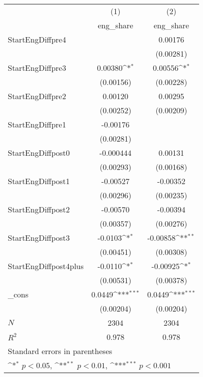 {
\def\sym#1{\ifmmode^{#1}\else\(^{#1}\)\fi}
\begin{tabular}{l*{2}{c}}
\hline\hline
            &\multicolumn{1}{c}{(1)}&\multicolumn{1}{c}{(2)}\\
            &\multicolumn{1}{c}{eng\_share}&\multicolumn{1}{c}{eng\_share}\\
\hline
StartEngDiffpre4&                     &     0.00176         \\
            &                     &   (0.00281)         \\
[1em]
StartEngDiffpre3&     0.00380\sym{*}  &     0.00556\sym{*}  \\
            &   (0.00156)         &   (0.00228)         \\
[1em]
StartEngDiffpre2&     0.00120         &     0.00295         \\
            &   (0.00252)         &   (0.00209)         \\
[1em]
StartEngDiffpre1&    -0.00176         &                     \\
            &   (0.00281)         &                     \\
[1em]
StartEngDiffpost0&   -0.000444         &     0.00131         \\
            &   (0.00293)         &   (0.00168)         \\
[1em]
StartEngDiffpost1&    -0.00527         &    -0.00352         \\
            &   (0.00296)         &   (0.00235)         \\
[1em]
StartEngDiffpost2&    -0.00570         &    -0.00394         \\
            &   (0.00357)         &   (0.00276)         \\
[1em]
StartEngDiffpost3&     -0.0103\sym{*}  &    -0.00858\sym{**} \\
            &   (0.00451)         &   (0.00308)         \\
[1em]
StartEngDiffpost4plus&     -0.0110\sym{*}  &    -0.00925\sym{*}  \\
            &   (0.00531)         &   (0.00378)         \\
[1em]
\_cons      &      0.0449\sym{***}&      0.0449\sym{***}\\
            &   (0.00204)         &   (0.00204)         \\
\hline
\(N\)       &        2304         &        2304         \\
\(R^{2}\)   &       0.978         &       0.978         \\
\hline\hline
\multicolumn{3}{l}{\footnotesize Standard errors in parentheses}\\
\multicolumn{3}{l}{\footnotesize \sym{*} \(p<0.05\), \sym{**} \(p<0.01\), \sym{***} \(p<0.001\)}\\
\end{tabular}
}

